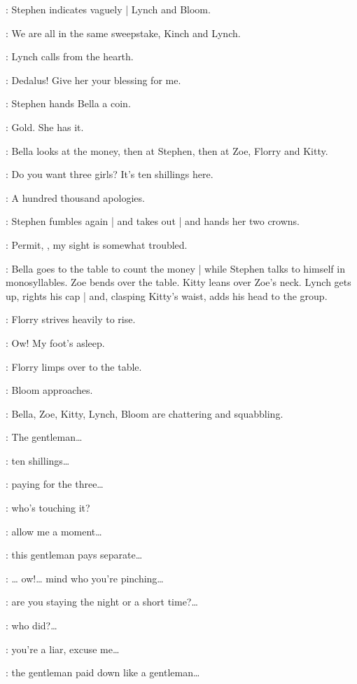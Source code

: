 :
Stephen indicates vaguely |
Lynch and Bloom.

\Stephen:
We are all in the same sweepstake,
Kinch and Lynch.

:
Lynch calls from the hearth.

\Lynch:
Dedalus!
Give her your blessing for me.

:
Stephen hands Bella a coin.

\Stephen:
Gold.
She has it.

:
Bella looks at the money,
then at Stephen,
then at Zoe,
Florry and Kitty.

\Bella:
Do you want three girls?
It's ten shillings here.

\Stephen:
A hundred thousand apologies.

:
Stephen fumbles again |
and takes out |
and hands her two crowns.

\Stephen:
Permit,
,
my sight is somewhat troubled.

:
Bella goes to the table to count the money |
while Stephen talks to himself in monosyllables.
Zoe bends over the table.
Kitty leans over Zoe's neck.
%
Lynch gets up,
rights his cap |
and,
clasping Kitty's waist,
adds his head to the group.

:
Florry strives heavily to rise.

\Florry:
Ow!
My foot's asleep.

:
Florry limps over to the table.

:
Bloom approaches.

:
Bella,
Zoe,
Kitty,
Lynch,
Bloom are chattering and squabbling.

\Zoe:
The gentleman…

\Bella:
ten shillings…

\Lynch:
paying for the three…

\Kitty:
who's touching it?

\Bloom:
allow me a moment…

\Zoe:
this gentleman pays separate…

\Kitty:
… ow!…
mind who you're pinching…

\Bella:
are you staying the night or a short time?…

\Lynch:
who did?…

\Kitty:
you're a liar,
excuse me…

\Zoe:
the gentleman paid down like a gentleman…

